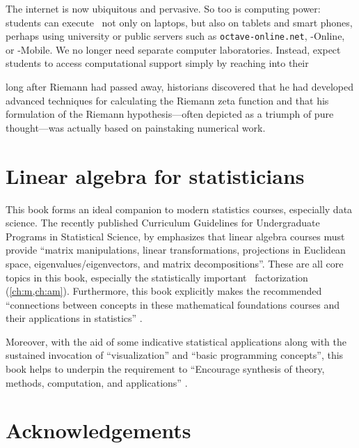 The internet is now ubiquitous and pervasive. 
So too is computing power: students can execute \script\ not only on laptops, but also on tablets and smart phones, perhaps using university or public servers such as \verb|octave-online.net|, \script[1]-Online, or \script[1]-Mobile. 
We no longer need separate computer laboratories.
Instead, expect students to access computational support simply by reaching into their 

\begin{quoted}{\cite{Donoho2015}}
long after Riemann had passed away, historians discovered that he had developed advanced techniques for calculating the Riemann zeta function and that his formulation of the Riemann hypothesis---often depicted as a triumph of pure thought---was actually based on painstaking numerical work.
\end{quoted}







\section*{Linear algebra for statisticians}

This book forms an ideal companion to modern statistics courses, especially data science.
The recently published Curriculum Guidelines for Undergraduate Programs in Statistical Science, by \cite{StatsEduGuidelines2014} emphasizes that linear algebra courses must provide ``matrix manipulations, linear transformations, projections in Euclidean space, eigenvalues\slash eigenvectors, and matrix decompositions''.
These are all core topics in this book, especially the statistically 
important \svd\ factorization (\cref{ch:m,ch:am}).
Furthermore, this book explicitly makes the recommended ``connections between concepts in these mathematical foundations courses and their applications in statistics'' \cite[p.12]{StatsEduGuidelines2014}.

Moreover, with the aid of some indicative statistical applications along with the sustained invocation of ``visualization'' and  ``basic programming concepts'', this book helps to underpin the requirement to ``Encourage synthesis of theory, methods, computation, and applications'' \cite[p.13]{StatsEduGuidelines2014}.






\section*{Acknowledgements}

